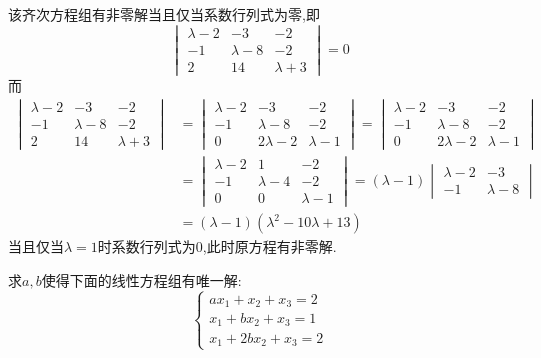 \documentclass{ctexart}
\begin{document}
\begin{solution}
    该齐次方程组有非零解当且仅当系数行列式为零,即
    \[\begin{vmatrix}
        \lambda-2&-3&-2\\
        -1&\lambda-8&-2\\
        2&14&\lambda+3
    \end{vmatrix}=0\]
    而
    \[\begin{aligned}
        \begin{vmatrix}
            \lambda-2&-3&-2\\
            -1&\lambda-8&-2\\
            2&14&\lambda+3
        \end{vmatrix}
        &= \begin{vmatrix}
                \lambda-2&-3&-2\\
                -1&\lambda-8&-2\\
                0&2\lambda-2&\lambda-1
            \end{vmatrix}=
            \begin{vmatrix}
                \lambda-2&-3&-2\\
                -1&\lambda-8&-2\\
                0&2\lambda-2&\lambda-1
            \end{vmatrix} \\
        &= \begin{vmatrix}
                \lambda-2&1&-2\\
                -1&\lambda-4&-2\\
                0&0&\lambda-1
            \end{vmatrix} = 
            (\lambda-1)\begin{vmatrix}
                \lambda-2&-3\\
                -1&\lambda-8
            \end{vmatrix} \\
        &= (\lambda-1)(\lambda^2-10\lambda+13)
    \end{aligned}\]
    当且仅当$\lambda=1$时系数行列式为$0$,此时原方程有非零解.
\end{solution}
\begin{homework}[5]
    求$a,b$使得下面的线性方程组有唯一解:
    \[\left\{\begin{array}{l}
        ax_1+x_2+x_3=2\\
        x_1+bx_2+x_3=1\\
        x_1+2bx_2+x_3=2
    \end{array}\right.\]
\end{homework}
\end{document}
